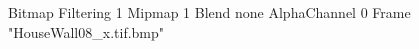 {Bitmap
	{Filtering 1}
	{Mipmap 1}
	{Blend none}
	{AlphaChannel 0}
	{Frame "HouseWall08_x.tif.bmp"}
}
